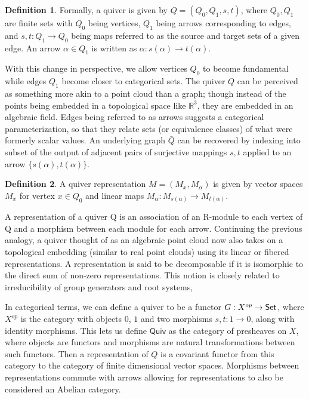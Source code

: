 \documentclass{article}
\theoremstyle{definition}
\newtheorem{definition}{Definition}[section]
\begin{document}
\begin{definition}
    Formally, a quiver is given by $Q=(Q_0, Q_1, s, t)$, where $Q_0,Q_1$ are finite sets with $Q_0$ being vertices, $Q_1$ being arrows corresponding to edges, and $s, t: Q_1 \to Q_0$ being maps referred to as the source and target sets of a given edge. An arrow $\alpha \in Q_1$ is written as $\alpha: s(\alpha) \to t(\alpha)$.
\end{definition}


With this change in perspective, we allow vertices $Q_0$ to become fundamental while edges $Q_1$ become closer to categorical sets. The quiver $Q$ can be perceived as something more akin to a point cloud than a graph; though instead of the points being embedded in a topological space like $\mathbb{R}^3$, they are embedded in an algebraic field. 
Edges being referred to as arrows suggests a categorical parameterization, so that they relate sets (or equivalence classes) of what were formerly scalar values. 
An underlying graph $\bar{Q}$ can be recovered by indexing into subset of the output of adjacent pairs of surjective mappings $s, t$ applied to an arrow $\{s(\alpha), t(\alpha)\}$.


\begin{definition}
    A quiver representation $M=(M_x, M_\alpha)$ is given by vector spaces $M_x$ for vertex $x \in Q_0$ and linear maps $M_\alpha: M_{s(\alpha)} \to M_{t(\alpha)}$.
\end{definition}

A representation of a quiver Q is an association of an R-module to each vertex of Q and a morphism between each module for each arrow. Continuing the previous analogy, a quiver thought of as an algebraic point cloud now also takes on a topological embedding (similar to real point clouds) using its linear or fibered representations.  A representation is said to be decomposable if it is isomorphic to the direct sum of non-zero representations. This notion is closely related to irreducibility of group generators and root systems, 


In categorical terms, we can define a quiver to be a functor $G:X^{\normalfont{op}}\to \mathsf{Set}$, where $X^{op}$ is the category with objects $0$, $1$ and two morphisms $s,t:1 \to 0$, along with identity morphisms. This lets us define $\mathsf{Quiv}$ as the category of presheaves on $X$, where objects are functors and morphisms are natural transformations between such functors. Then a representation of $Q$ is a covariant functor from this category to the category of finite dimensional vector spaces. Morphisms between representations commute with arrows allowing for representations to also be considered an Abelian category.
\end{document}
